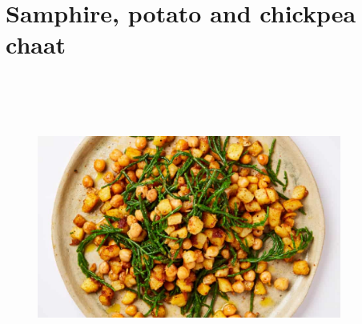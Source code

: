 \documentclass{book}
\begin{document}
\section{Samphire, potato and chickpea chaat}
\begin{figure}
\centering\includegraphics[width=10cm,height=10cm,keepaspectratio]{Recipe_Pictures/Samphire,_potato_and_chickpea_chaat.png}
\end{figure}
\end{document}
